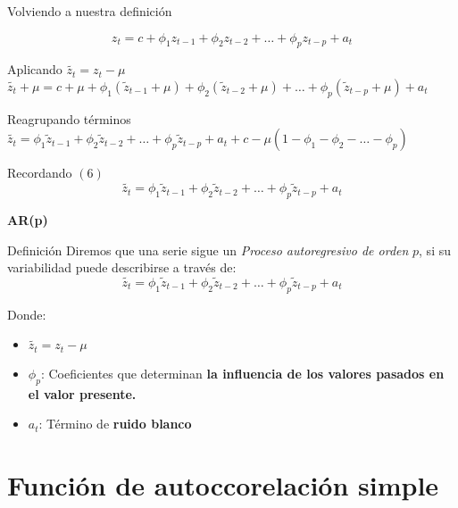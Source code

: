 \documentclass[11pt]{beamer}
\begin{document}
\begin{frame}{Volviendo a nuestra definición}
\begin{block}{}
	$$ z_t = c + \phi_1 z_{t-1} + \phi_2 z_{t-2} + \dots + \phi_p z_{t-p} + a_t $$
\end{block}
\begin{block}{Aplicando $\tilde{z_t}=z_t-\mu$}
	$ \tilde{z_t} + \mu = c + \mu + \phi_1 (\tilde{z}_{t-1} + \mu) + \phi_2 (\tilde{z}_{t-2} + \mu) + \dots + \phi_p (\tilde{z}_{t-p} + \mu) + a_t $
\end{block}
\begin{block}{Reagrupando términos}
	$ \tilde{z_t}  = \phi_1 \tilde{z}_{t-1} + \phi_2 \tilde{z}_{t-2} + \dots + \phi_p \tilde{z}_{t-p} + a_t + c - \mu ( 1 - \phi_1 - \phi_2 - \dots - \phi_p )$
\end{block}
\begin{block}{Recordando $(6)$}
\begin{equation}
\tilde{z_t}  = \phi_1 \tilde{z}_{t-1} + \phi_2 \tilde{z}_{t-2} + \dots + \phi_p \tilde{z}_{t-p} + a_t
\end{equation}
\end{block}
\end{frame}

\begin{frame}{\textbf{AR(p)}}
\begin{block}{Definición}
Diremos que una serie sigue un \textit{Proceso autoregresivo de orden} $p$, si su variabilidad puede describirse a través de: 
$$ \tilde{z_t}  = \phi_1 \tilde{z}_{t-1} + \phi_2 \tilde{z}_{t-2} + \dots + \phi_p \tilde{z}_{t-p} + a_t $$
\end{block}

\begin{block}{Donde:}
\begin{itemize}
	\item $\tilde{z_t}=z_t-\mu$
	\item $\phi_p$: Coeficientes que determinan \textbf{la influencia de los valores pasados en el valor presente.}
	\item $a_t$: Término de \textbf{ruido blanco}
\end{itemize}
\end{block}
\end{frame}

\section{Función de autoccorelación simple}
\begin{frame} 
\tableofcontents[currentsection] %
\end{frame}
\end{document}
